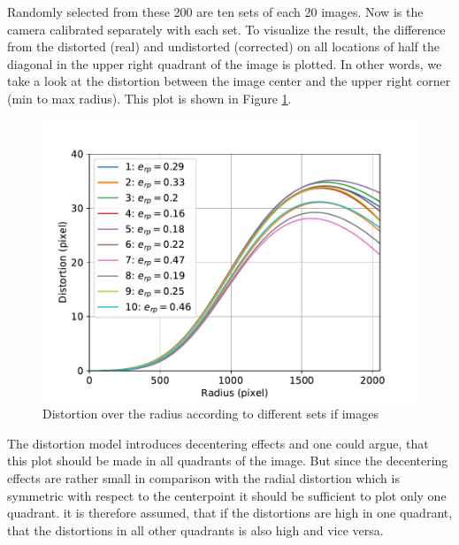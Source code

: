 Randomly selected from these 200 are ten sets of each 20 images.
Now is the camera calibrated separately with each set.
To visualize the result, the difference from the distorted (real) and undistorted (corrected) on all locations of half the diagonal in the upper right quadrant of the image is plotted.
In other words, we take a look at the distortion between the image center and the upper right corner (min to max radius).
This plot is shown in Figure \ref{development:stat}.

\begin{figure}[ht]
	\centering
	\includegraphics[width=0.9\linewidth]{3-development/calibration/images/stat.pdf}
	\caption{Distortion over the radius according to different sets if images\label{development:stat}}
\end{figure}

The distortion model introduces decentering effects and one could argue, that this plot should be made in all quadrants of the image.
But since the decentering effects are rather small in comparison with the radial distortion which is symmetric with respect to the centerpoint it should be sufficient to plot only one quadrant.
it is therefore assumed, that if the distortions are high in one quadrant, that the distortions in all other quadrants is also high and vice versa.



